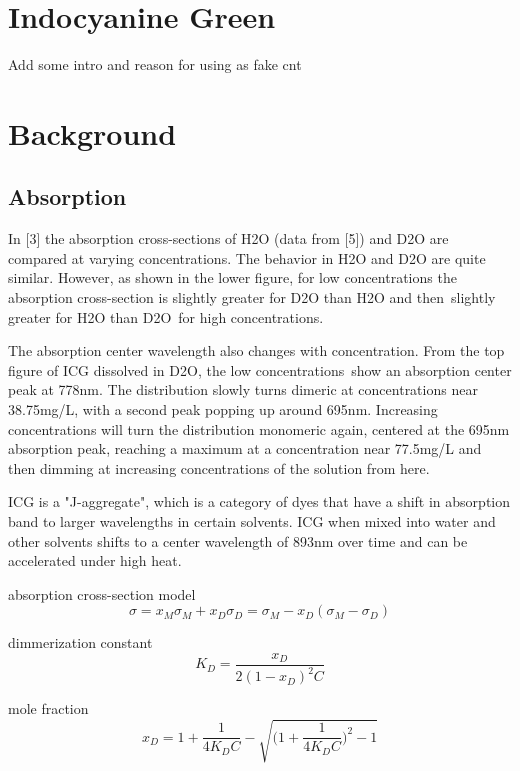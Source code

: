 \section{Indocyanine Green}
Add some intro and reason for using as fake cnt

\section{Background}
\subsection{ Absorption}
In [3] the absorption cross-sections of H2O (data from [5]) and D2O are compared at varying concentrations. The behavior in H2O and D2O are quite similar. However, as shown in the lower figure, for low concentrations the absorption cross-section is slightly greater for D2O than H2O and then slightly greater for H2O than D2O for high concentrations.

The absorption center wavelength also changes with concentration. From the top figure of ICG dissolved in D2O, the low concentrations show an absorption center peak at 778nm. The distribution slowly turns dimeric at concentrations near 38.75mg/L, with a second peak popping up around 695nm. Increasing concentrations will turn the distribution monomeric again, centered at the 695nm absorption peak, reaching a maximum at a concentration near 77.5mg/L and then dimming at increasing concentrations of the solution from here. 

ICG is a "J-aggregate", which is a category of dyes that have a shift in absorption band to larger wavelengths in certain solvents. ICG when mixed into water and other solvents shifts to a center wavelength of 893nm over time and can be accelerated under high heat. 

absorption cross-section model
\begin{equation}
	\sigma = x_M \sigma_M + x_D \sigma_D = \sigma_M - x_D(\sigma_M - \sigma_D)
\end{equation}

dimmerization constant
\begin{equation}
	K_D = \frac{x_D}{2(1-x_D)^2C}
\end{equation}

mole fraction
\begin{equation}
	x_D = 1 + \frac{1}{4K_DC} - \sqrt{\big( 1 + \frac{1}{4K_DC}\big)^2-1}
\end{equation}


